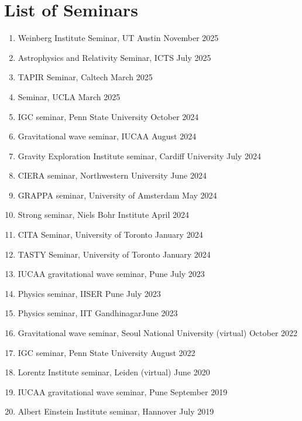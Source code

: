 		\section{List of Seminars}
		\begin{enumerate}[leftmargin=*]
			\item Weinberg Institute Seminar, UT Austin \hfill November 2025
			\item Astrophysics and Relativity Seminar, ICTS \hfill July 2025
			\item TAPIR Seminar, Caltech  \hfill March 2025
			\item Seminar, UCLA \hfill March 2025
			\item IGC seminar, Penn State University \hfill October 2024
			\item Gravitational wave seminar, IUCAA \hfill August 2024
			\item Gravity Exploration Institute seminar, Cardiff University \hfill July 2024 
			\item CIERA seminar, Northwestern University \hfill June 2024 
			\item GRAPPA seminar, University of Amsterdam \hfill May 2024 
			\item Strong seminar, Niels Bohr Institute \hfill April 2024 
			\item CITA Seminar, University of Toronto \hfill January 2024
			\item TASTY Seminar, University of Toronto \hfill January 2024
			\item IUCAA gravitational wave seminar, Pune \hfill July 2023
			\item Physics seminar, IISER Pune \hfill July 2023
			\item Physics seminar, IIT Gandhinagar\hfill June 2023
			\item Gravitational wave seminar, Seoul National University (virtual) \hfill October 2022 
			\item IGC seminar, Penn State University \hfill August 2022
			\item Lorentz Institute seminar, Leiden (virtual) \hfill June 2020
			\item IUCAA gravitational wave seminar, Pune \hfill September 2019
			\item Albert Einstein Institute seminar, Hannover \hfill July 2019
		\end{enumerate}

